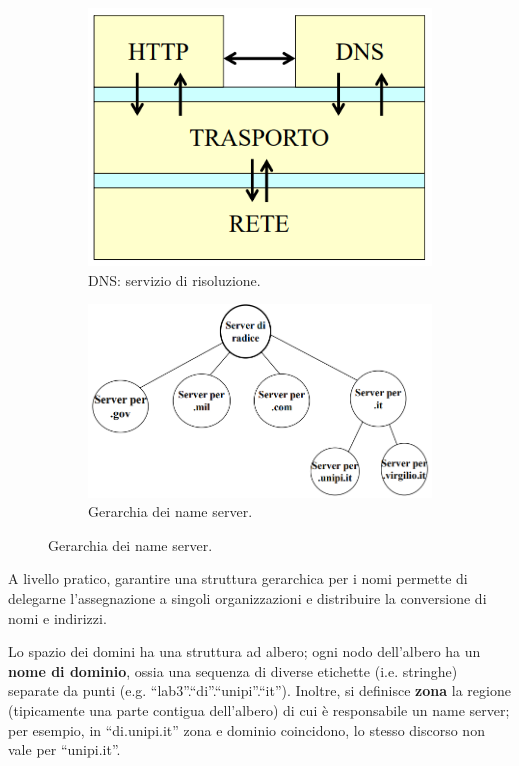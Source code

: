 \documentclass[11pt, italian, openany]{book}
\begin{document}
\begin{sloppypar}
\begin{itemize}[topsep=0pt]
	\begin{figure}[!h]
		\begin{subfigure}{0.49 \linewidth} \centering
			\includegraphics[scale=0.35]{images/dns-servizio.png}
			\caption{DNS: servizio di risoluzione.}
		\end{subfigure}
		\begin{subfigure}{0.49 \linewidth} \centering
			\includegraphics[scale=0.32]{images/dns-gerarchia-nameserver.png}
			\caption{Gerarchia dei name server.}
		\end{subfigure}
	\end{figure}

	A livello pratico, garantire una struttura gerarchica per i nomi permette di delegarne l'assegnazione a singoli organizzazioni e distribuire la conversione
	di nomi e indirizzi.

	Lo spazio dei domini ha una struttura ad albero; ogni nodo dell'albero ha un \textbf{nome di dominio}, ossia una sequenza di diverse
	etichette (i.e. stringhe) separate da punti (e.g. ``lab3''.``di''.``unipi''.``it''). Inoltre, si definisce \textbf{zona} la regione (tipicamente una parte
	contigua dell’albero) di cui \`e responsabile un name server; per esempio, in ``di.unipi.it'' zona e dominio coincidono, lo stesso discorso non vale per 
	``unipi.it''.


\end{itemize}
\end{sloppypar}
\end{document}

